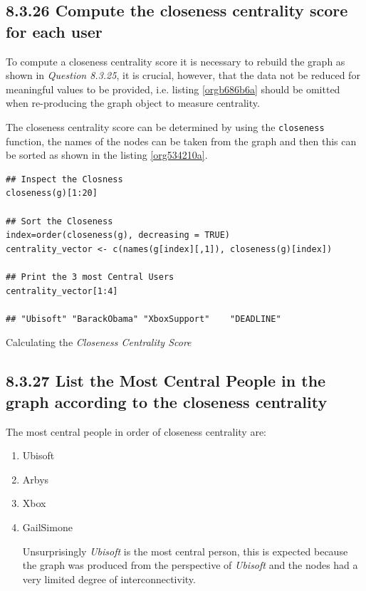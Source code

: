 \documentclass[11pt]{article}
\begin{document}
\subsection{8.3.26 Compute the \textbf{closeness} centrality score for each user}
\label{sec:org807fd30}
To compute a closeness centrality score it is necessary to rebuild the
graph as shown in \emph{Question 8.3.25}, it is crucial, however, that the data
not be reduced for meaningful values to be provided, i.e. listing
\ref{orgb686b6a} should be omitted when re-producing the graph object to measure centrality.

The closeness centrality score can be determined by using the \texttt{closeness} function, the names of the nodes can be taken from the graph and then this can be sorted as shown in the listing \ref{org534210a}.

\begin{listing}[htbp]
\begin{verbatim}
## Inspect the Closness
closeness(g)[1:20]

## Sort the Closeness
index=order(closeness(g), decreasing = TRUE)
centrality_vector <- c(names(g[index][,1]), closeness(g)[index])

## Print the 3 most Central Users
centrality_vector[1:4]

## "Ubisoft" "BarackObama" "XboxSupport"    "DEADLINE"
\end{verbatim}
\caption{\label{org534210a}Calculating the \emph{Closeness Centrality Score}}
\end{listing}

\subsection{8.3.27 List the Most Central People in the graph according to the closeness centrality}
\label{sec:orgff90304}
The most central people in order of closeness centrality are:

\begin{enumerate}
\item Ubisoft
\item Arbys
\item Xbox
\item GailSimone

Unsurprisingly \emph{Ubisoft} is the most central person, this is expected because the graph was produced from the perspective of \emph{Ubisoft} and the nodes had a very limited degree of interconnectivity.
\end{enumerate}
\end{document}
